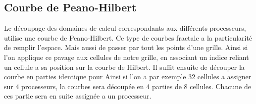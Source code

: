 %
%
%
%
%
%
%
%
%
%
%
%
%



\subsection{Courbe de Peano-Hilbert}
\label{sec:parasoft}



Le découpage des domaines de calcul correspondants aux différents processeurs, utilise une courbe de Peano-Hilbert.
Ce type de courbes fractale a la particularité de remplir l'espace.
Mais aussi de passer par tout les points d'une grille.
Ainsi si l'on applique ce pavage aux cellules de notre grille, en associant un indice reliant un cellule a sa position sur la courbe de Hilbert.
Il suffit ensuite de découper la courbe en parties identique  pour 
Ainsi si l'on a par exemple  32 cellules a assigner sur 4 processeurs, la courbes sera découpée en 4 parties de 8 cellules.
Chacune de ces partie sera en suite assignée a un processeur.

